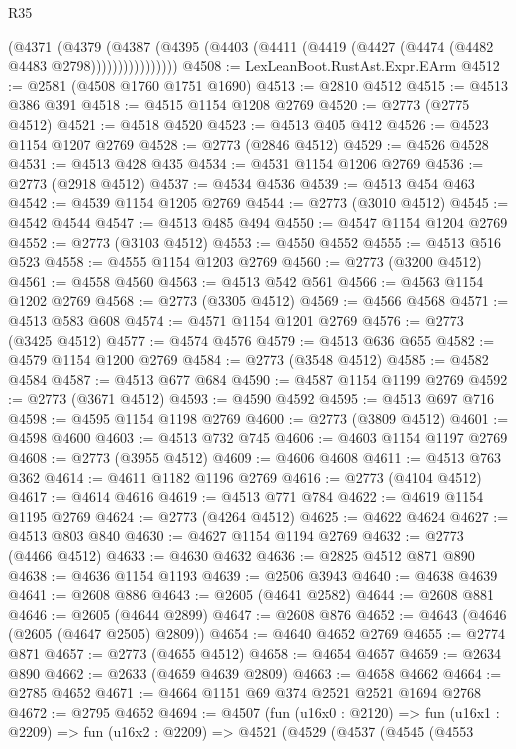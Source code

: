 \begin{lexlean}{R35}
\begin{coremodule}
                (@4371
                  (@4379
                    (@4387
                      (@4395 (@4403 (@4411 (@4419 (@4427 (@4474 (@4482 @4483 @2798))))))))))))))))
@4508 := LexLeanBoot.RustAst.Expr.EArm
@4512 := @2581 (@4508 @1760 @1751 @1690)
@4513 := @2810 @4512
@4515 := @4513 @386 @391
@4518 := @4515 @1154 @1208 @2769
@4520 := @2773 (@2775 @4512)
@4521 := @4518 @4520
@4523 := @4513 @405 @412
@4526 := @4523 @1154 @1207 @2769
@4528 := @2773 (@2846 @4512)
@4529 := @4526 @4528
@4531 := @4513 @428 @435
@4534 := @4531 @1154 @1206 @2769
@4536 := @2773 (@2918 @4512)
@4537 := @4534 @4536
@4539 := @4513 @454 @463
@4542 := @4539 @1154 @1205 @2769
@4544 := @2773 (@3010 @4512)
@4545 := @4542 @4544
@4547 := @4513 @485 @494
@4550 := @4547 @1154 @1204 @2769
@4552 := @2773 (@3103 @4512)
@4553 := @4550 @4552
@4555 := @4513 @516 @523
@4558 := @4555 @1154 @1203 @2769
@4560 := @2773 (@3200 @4512)
@4561 := @4558 @4560
@4563 := @4513 @542 @561
@4566 := @4563 @1154 @1202 @2769
@4568 := @2773 (@3305 @4512)
@4569 := @4566 @4568
@4571 := @4513 @583 @608
@4574 := @4571 @1154 @1201 @2769
@4576 := @2773 (@3425 @4512)
@4577 := @4574 @4576
@4579 := @4513 @636 @655
@4582 := @4579 @1154 @1200 @2769
@4584 := @2773 (@3548 @4512)
@4585 := @4582 @4584
@4587 := @4513 @677 @684
@4590 := @4587 @1154 @1199 @2769
@4592 := @2773 (@3671 @4512)
@4593 := @4590 @4592
@4595 := @4513 @697 @716
@4598 := @4595 @1154 @1198 @2769
@4600 := @2773 (@3809 @4512)
@4601 := @4598 @4600
@4603 := @4513 @732 @745
@4606 := @4603 @1154 @1197 @2769
@4608 := @2773 (@3955 @4512)
@4609 := @4606 @4608
@4611 := @4513 @763 @362
@4614 := @4611 @1182 @1196 @2769
@4616 := @2773 (@4104 @4512)
@4617 := @4614 @4616
@4619 := @4513 @771 @784
@4622 := @4619 @1154 @1195 @2769
@4624 := @2773 (@4264 @4512)
@4625 := @4622 @4624
@4627 := @4513 @803 @840
@4630 := @4627 @1154 @1194 @2769
@4632 := @2773 (@4466 @4512)
@4633 := @4630 @4632
@4636 := @2825 @4512 @871 @890
@4638 := @4636 @1154 @1193
@4639 := @2506 @3943
@4640 := @4638 @4639
@4641 := @2608 @886
@4643 := @2605 (@4641 @2582)
@4644 := @2608 @881
@4646 := @2605 (@4644 @2899)
@4647 := @2608 @876
@4652 := @4643 (@4646 (@2605 (@4647 @2505) @2809))
@4654 := @4640 @4652 @2769
@4655 := @2774 @871
@4657 := @2773 (@4655 @4512)
@4658 := @4654 @4657
@4659 := @2634 @890
@4662 := @2633 (@4659 @4639 @2809)
@4663 := @4658 @4662
@4664 := @2785 @4652
@4671 := @4664 @1151 @69 @374 @2521 @2521 @1694 @2768
@4672 := @2795 @4652
@4694 := @4507
    (fun (u16x0 : @2120) =>
    fun (u16x1 : @2209) =>
    fun (u16x2 : @2209) =>
    @4521
      (@4529
        (@4537
          (@4545
            (@4553

\end{coremodule}
\end{lexlean}
